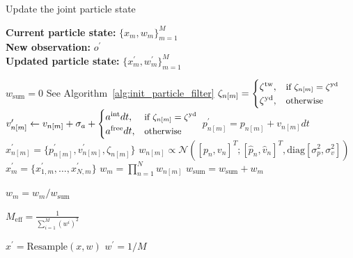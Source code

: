 \begin{algorithm}[!h]
    \caption{Update the joint particle state}\label{alg:particle_filter}
    \hspace*{\algorithmicindent} \textbf{Current particle state:} $\{x_m,w_m\}^M_{m=1}$ \\
    \hspace*{\algorithmicindent} \textbf{New observation:} $o^\prime$ \\
    \hspace*{\algorithmicindent} \textbf{Updated particle state:} $\{x_m^\prime,w_m^\prime\}^M_{m=1}$ 
   
    \begin{algorithmic}[1]
    \State $w_\mathrm{sum}=0$
            \State See Algorithm~\ref{alg:init_particle_filter}
         \Else
            \State $\zeta_{n[m]}= \begin{cases}
                            \zeta^\mathrm{tw}, & \text{\small if $\zeta_{n[m]}= \zeta^\mathrm{yd}$} \\
                            \zeta^\mathrm{yd}, & \text{\small otherwise}
                        \end{cases}$
            \EndIf
            \State $v_{n[m]}^\prime \gets v_{n[m]} + \sigma_a + \begin{cases}
                            a^\mathrm{int} dt, & \text{\small if $\zeta_{n[m]}= \zeta^\mathrm{yd}$} \\
                            a^\mathrm{free} dt, & \text{\small otherwise}
                        \end{cases}$ 
             \State $p_{n[m]}^\prime = p_{n[m]} + v_{n[m]} dt$
         \EndIf
        \State $x_{n[m]}^\prime = \{p_{n[m]}^\prime, v_{n[m]}^\prime, \zeta_{n[m]}\}$
        \State $w_{n[m]} \propto \mathcal{N}([p_n, v_n]^T ; [\hat{p}_n, \hat{v}_n]^T, \mathrm{diag}[\sigma_p^2, \sigma_v^2])$
        \EndFor
        \State $x_{m}^\prime = \{x_{1,m}^\prime, \dots, x_{N,m}^\prime\}$
        \State $w_m = \prod_{n=1}^N w_{n[m]}$ 
        \State $w_\mathrm{sum}=w_\mathrm{sum}+w_m$
    \EndFor

        \State $w_m=w_m / w_\mathrm{sum}$
    \EndFor
    
    \State $M_\mathrm{eff} = \frac{1}{\sum^M_{i=1}(w^i)^2}$
    \vspace{0.5em}
        
        \State $x^\prime = \text{Resample}(x,w)$
        \State $w^\prime = 1/M$
    \EndIf
        
    \end{algorithmic}
\end{algorithm}

